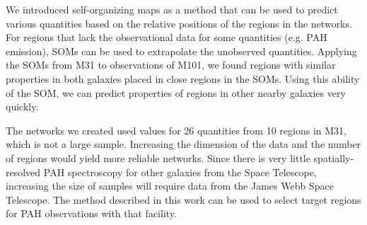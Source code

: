 We introduced self-organizing maps as a method that can be used to predict various quantities based on the relative positions of the regions in the networks.
For regions that lack the observational data for some quantities (e.g. PAH emission), SOMs can be used to extrapolate the unobserved quantities.
Applying the SOMs from M31 to observations of M101, we found regions with similar properties in both galaxies placed in close regions in the SOMs.
Using this ability of the SOM, we can predict properties of regions in other nearby galaxies very quickly.

The networks we created used values for 26 quantities from 10 regions in M31, which is not a large sample.
Increasing the dimension of the data and the number of regions would yield more reliable networks.
Since there is very little spatially-resolved PAH spectroscopy for other galaxies from the \Spitzer Space Telescope, increasing the size of samples will require data from the James Webb Space Telescope.
The method described in this work can be used to select target regions for PAH observations with that facility. 




